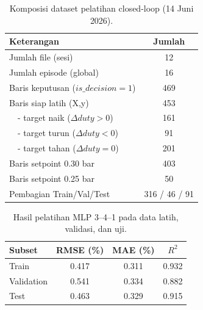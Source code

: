 \begin{table}[h]
  \centering
  \caption{Komposisi dataset pelatihan closed-loop (14 Juni 2026).}
  \label{tab:dataset}
  \begin{tabular}{lc}
    \hline
    \textbf{Keterangan} & \textbf{Jumlah} \\
    \hline
    Jumlah file (sesi)              & 12 \\
    Jumlah episode (global)         & 16 \\
    Baris keputusan ($is\_decision=1$) & 469 \\
    Baris siap latih (X,y)          & 453 \\
    ~~- target naik ($\Delta duty>0$)  & 161 \\
    ~~- target turun ($\Delta duty<0$) & 91 \\
    ~~- target tahan ($\Delta duty=0$) & 201 \\
    Baris setpoint 0.30 bar         & 403 \\
    Baris setpoint 0.25 bar         & 50 \\
    Pembagian Train/Val/Test        & 316 / 46 / 91 \\
    \hline
  \end{tabular}
\end{table}

\begin{table}[h]
  \centering
  \caption{Hasil pelatihan MLP 3--4--1 pada data latih, validasi, dan uji.}
  \label{tab:hasil_latih}
  \begin{tabular}{lccc}
    \hline
    \textbf{Subset} & \textbf{RMSE (\%)} & \textbf{MAE (\%)} & \textbf{$R^2$} \\
    \hline
    Train      & 0.417 & 0.311 & 0.932 \\
    Validation & 0.541 & 0.334 & 0.882 \\
    Test       & 0.463 & 0.329 & 0.915 \\
    \hline
  \end{tabular}
\end{table}

